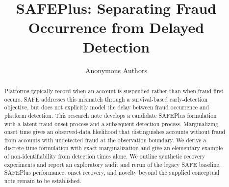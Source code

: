 \documentclass{article}
\title{SAFEPlus: Separating Fraud Occurrence from Delayed Detection}
\author{Anonymous Authors}
\begin{document}
\maketitle
\begin{abstract}
Platforms typically record when an account is suspended rather than when
fraud first occurs. SAFE addresses this mismatch through a survival-based
early-detection objective, but does not explicitly model the delay between
fraud occurrence and platform detection. This research note develops a
candidate SAFEPlus formulation with a latent fraud onset process and a
subsequent detection process. Marginalizing onset time gives an observed-data
likelihood that distinguishes accounts without fraud from accounts with
undetected fraud at the observation boundary. We derive a discrete-time
formulation with exact marginalization and give an elementary example of
non-identifiability from detection times alone. We outline synthetic recovery
experiments and report an exploratory audit and rerun of the legacy SAFE
baseline. SAFEPlus performance, onset recovery, and novelty beyond the
supplied conceptual note remain to be established.
\end{abstract}







\end{document}
